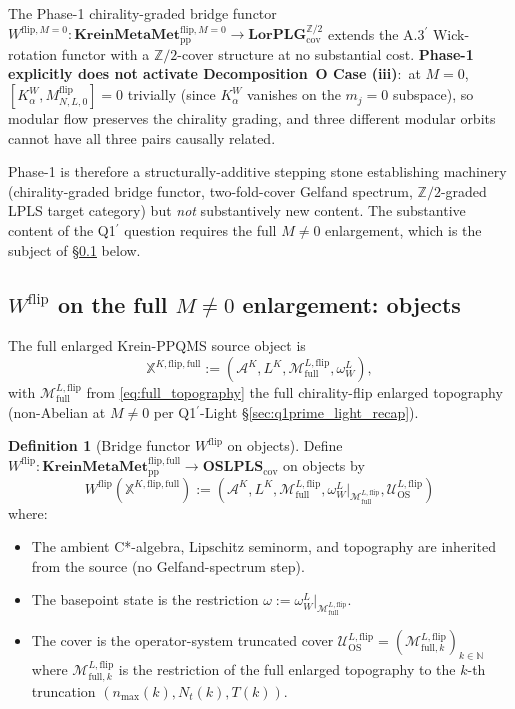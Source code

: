 \documentclass[11pt,a4paper]{article}
\theoremstyle{plain}
\theoremstyle{definition}
\newtheorem{definition}[theorem]{Definition}
\newcommand{\nmax}{n_{\max}}
\newcommand{\Nt}{N_{t}}
\newcommand{\Acal}{\mathcal{A}}
\newcommand{\Mcal}{\mathcal{M}}
\newcommand{\Ucal}{\mathcal{U}}
\newcommand{\N}{\mathbb{N}}
\newcommand{\Z}{\mathbb{Z}}
\newcommand{\BWvac}{\omega_{W}^{L}}
\newcommand{\Kalpha}{K_{\alpha}^{W}}
\newcommand{\OSLPLS}{\mathbf{OSLPLS}_{\mathrm{cov}}}
\newcommand{\KreinMMflip}{\mathbf{KreinMetaMet}_{\mathrm{pp}}^{\mathrm{flip},\mathrm{full}}}
\newcommand{\KreinMMflipMzero}{\mathbf{KreinMetaMet}_{\mathrm{pp}}^{\mathrm{flip},M=0}}
\newcommand{\LorPLGZtwo}{\mathbf{LorPLG}_{\mathrm{cov}}^{\Z/2}}
\newcommand{\Mflipfull}{\Mcal^{L,\mathrm{flip}}_{\mathrm{full}}}
\newcommand{\Wflip}{W^{\mathrm{flip}}}
\newcommand{\WflipMzero}{W^{\mathrm{flip},M=0}}
\newcommand{\Mflip}[3]{M^{\mathrm{flip}}_{#1,#2,#3}}
\newcommand{\osXkrein}{\mathbb{X}^{K,\mathrm{flip},\mathrm{full}}}
\begin{document}
The Phase-1 chirality-graded bridge functor
$\WflipMzero:\KreinMMflipMzero\to\LorPLGZtwo$ extends the A.3$^{\prime}$
Wick-rotation functor with a $\Z/2$-cover structure at no
substantial cost. \textbf{Phase-1 explicitly does not activate
Decomposition~O Case (iii)}:\ at $M=0$, $[\Kalpha,\Mflip{N}{L}{0}]=0$
trivially (since $\Kalpha$ vanishes on the $m_{j}=0$ subspace), so
modular flow preserves the chirality grading, and three different
modular orbits cannot have all three pairs causally related.

Phase-1 is therefore a structurally-additive stepping stone establishing
machinery (chirality-graded bridge functor, two-fold-cover Gelfand
spectrum, $\Z/2$-graded LPLS target category) but \emph{not}
substantively new content. The substantive content of the Q1$^{\prime}$
question requires the full $M\ne 0$ enlargement, which is the subject
of \S\ref{sec:Wflip_full} below.

\subsection{$\Wflip$ on the full $M\ne 0$ enlargement: objects}
\label{sec:Wflip_full}

The full enlarged Krein-PPQMS source object is
\begin{equation}
  \osXkrein := (\Acal^{K}, L^{K}, \Mflipfull, \BWvac),
  \label{eq:source_object}
\end{equation}
with $\Mflipfull$ from \eqref{eq:full_topography} the full chirality-flip
enlarged topography (non-Abelian at $M\ne 0$ per Q1$^{\prime}$-Light
\S\ref{sec:q1prime_light_recap}).

\begin{definition}[Bridge functor $\Wflip$ on objects]
\label{def:Wflip}
Define $\Wflip:\KreinMMflip\to\OSLPLS$ on objects by
\begin{equation}
  \Wflip(\osXkrein) := (\Acal^{K}, L^{K}, \Mflipfull, \BWvac|_{\Mflipfull}, \Ucal^{L,\mathrm{flip}}_{\mathrm{OS}})
  \label{eq:Wflip_object}
\end{equation}
where:
\begin{itemize}
\item The ambient C*-algebra, Lipschitz seminorm, and topography are
inherited from the source (no Gelfand-spectrum step).
\item The basepoint state is the restriction
$\omega:=\BWvac|_{\Mflipfull}$.
\item The cover is the operator-system truncated cover
$\Ucal^{L,\mathrm{flip}}_{\mathrm{OS}} = (\Mcal^{L,\mathrm{flip}}_{\mathrm{full},k})_{k\in\N}$
where $\Mcal^{L,\mathrm{flip}}_{\mathrm{full},k}$ is the restriction
of the full enlarged topography to the $k$-th truncation
$(\nmax(k),\Nt(k),T(k))$.
\end{itemize}
\end{definition}
\end{document}
